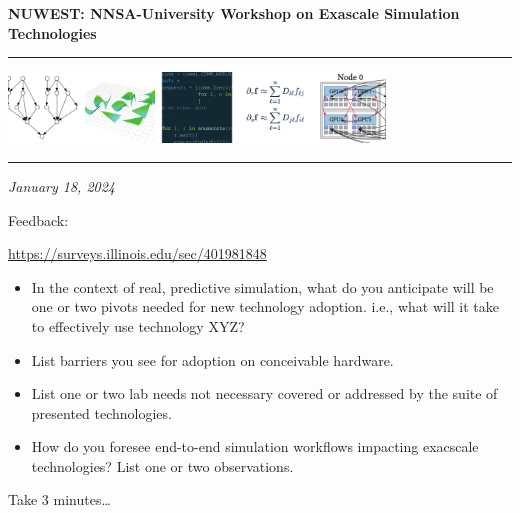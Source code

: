 \documentclass[aspectratio=169]{beamer}
\begin{document}
\begin{frame}\frametitle{}

  \vspace*{0.2in}

  \hspace*{0.0in}\textrm{{\huge\bfseries\color{IllinoisOrange} NUWEST: NNSA-University Workshop on Exascale Simulation Technologies}}

  \vspace*{0.2in}
  \hrule
  \begin{center}
    \includegraphics[width=0.75\textwidth]{./media/coverart-cs.pdf}
  \end{center}
  \hrule

  \vspace*{0.1in}
  \noindent\textit{January 18, 2024}\\
  \vspace*{0.1in}

\end{frame}

\begin{frame}{Feedback:}
  \begin{tcolorbox}[colframe=IllinoisOrange]
    \url{https://surveys.illinois.edu/sec/401981848}
  \end{tcolorbox}
  \begin{itemize}
    \item In the context of real, predictive simulation, what do you anticipate will be one or two pivots
      needed for new technology adoption.  i.e., what will it take to
      effectively use technology XYZ?
    \item List barriers you see for adoption on conceivable hardware. 
    \item List one or two lab needs not necessary covered or addressed by the
      suite of presented technologies.
    \item How do you foresee  end-to-end simulation workflows impacting
      exacscale technologies?  List one or two observations.
  \end{itemize}
  \alert{Take 3 minutes\ldots}
\end{frame}
\end{document}
